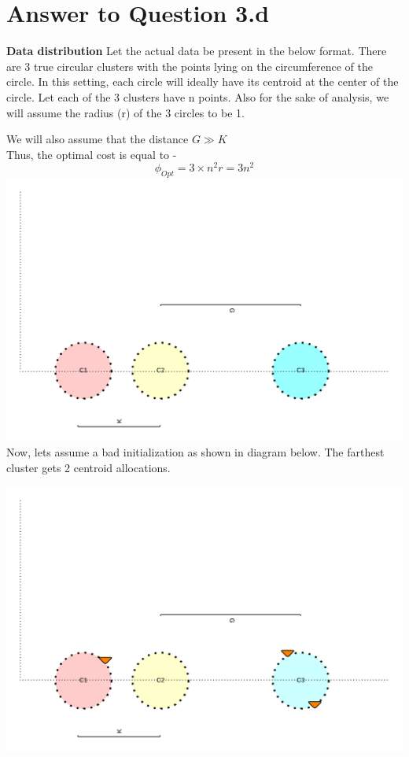 \documentclass[11pt]{article}
\begin{document}
{\pagebreak[4]
\section*{Answer to Question 3.d}

\textbf{Data distribution}
Let the actual data be present in the below format. There are 3 true circular clusters with the points lying on the circumference of the circle. In this setting, each circle will ideally have its centroid at the center of the circle. Let each of the 3 clusters have n points. Also for the sake of analysis, we will assume the radius (r) of the 3 circles to be 1.

We will also assume that the distance $G \gg K$
\\

Thus, the optimal cost is equal to -
$$\phi_{Opt} = 3 \times n^2 r = 3n^2$$
\includegraphics[scale=0.8]{q3_1} \\

Now, lets assume a bad initialization as shown in diagram below. The farthest cluster gets 2 centroid allocations.

\includegraphics[scale=0.8]{q3_2} \\

}
\end{document}
